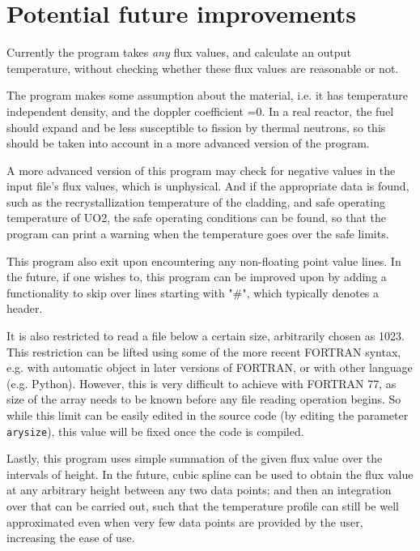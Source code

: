 \documentclass[a4paper, 12pt]{article}
\begin{document}
\section{Potential future improvements}
Currently the program takes \emph{any} flux values, and calculate an output temperature, without checking whether these flux values are reasonable or not.

The program makes some assumption about the material, i.e. it has temperature independent density, and the doppler coefficient =0. In a real reactor, the fuel should expand and be less susceptible to fission by thermal neutrons, so this should be taken into account in a more advanced version of the program.

A more advanced version of this program may check for negative values in the input file's flux values, which is unphysical. And if the appropriate data is found, such as the recrystallization temperature of the cladding, and safe operating temperature of UO2, the safe operating conditions can be found, so that the program can print a warning when the temperature goes over the safe limits.

This program also exit upon encountering any non-floating point value lines. In the future, if one wishes to, this program can be improved upon by adding a functionality to skip over lines starting with "\#", which typically denotes a header.

It is also restricted to read a file below a certain size, arbitrarily chosen as 1023. This restriction can be lifted using some of the more recent FORTRAN syntax, e.g. with automatic object in later versions of FORTRAN, or with other language (e.g. Python). However, this is very difficult to achieve with FORTRAN 77, as size of the array needs to be known before any file reading operation begins. So while this limit can be easily edited in the source code (by editing the parameter \texttt{arysize}), this value will be fixed once the code is compiled.
\cite{AutoObj}

Lastly, this program uses simple summation of the given flux value over the intervals of height. In the future, cubic spline can be used to obtain the flux value at any arbitrary height between any two data points; and then an integration over that can be carried out, such that the temperature profile can still be well approximated even when very few data points are provided by the user, increasing the ease of use.
\end{document}
